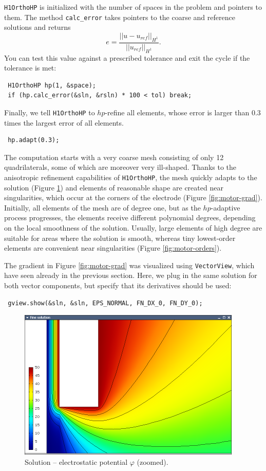 {\tt H1OrthoHP} is initialized with the number of spaces in the problem and pointers to them.
The method \verb"calc_error" takes pointers to the coarse and reference solutions and returns
$$e = \frac{|| u - u_{ref} ||_{H^1}}{|| u_{ref} ||_{H^1}}.$$
You can test this value against a prescribed tolerance and exit the cycle if the tolerance is met:
\begin{lstlisting}
 H1OrthoHP hp(1, &space);
 if (hp.calc_error(&sln, &rsln) * 100 < tol) break;
\end{lstlisting}

Finally, we tell {\tt H1OrthoHP} to $hp$-refine all elements, whose error is larger than
0.3 times the largest error of all elements.
\begin{lstlisting}
 hp.adapt(0.3);
\end{lstlisting}

The computation starts with a very coarse mesh consisting of only 12 quadrilaterals, some
of which are moreover very ill-shaped. Thanks to the anisotropic refinement capabilities
of {\tt H1OrthoHP}, the mesh quickly adapts to the solution (Figure \ref{fig:motor-sln})
and elements of reasonable shape are created near singularities, which occur at the
corners of the electrode (Figure \ref{fig:motor-grad}). Initially, all elements of the 
mesh are of degree one, but as the $hp$-adaptive process progresses, the elements receive
different polynomial degrees, depending on the local smoothness of the solution. 
Usually, large elements of high degree are suitable for areas where the solution is smooth,
whereas tiny lowest-order elements are convenient near singularities
(Figure \ref{fig:motor-orders}).

The gradient in Figure \ref{fig:motor-grad} was visualized using {\tt VectorView}, which have
seen already in the previous section. Here, we plug in the same solution for both vector
components, but specify that its derivatives should be used:
\begin{lstlisting}
 gview.show(&sln, &sln, EPS_NORMAL, FN_DX_0, FN_DY_0);
\end{lstlisting}


\begin{figure}[ht]
  \medskip \centering
  \includegraphics[width=0.95\textwidth]{img/motor-sln.png}
  \caption{Solution -- electrostatic potential $\varphi$ (zoomed).}
  \label{fig:motor-sln}
\end{figure}

